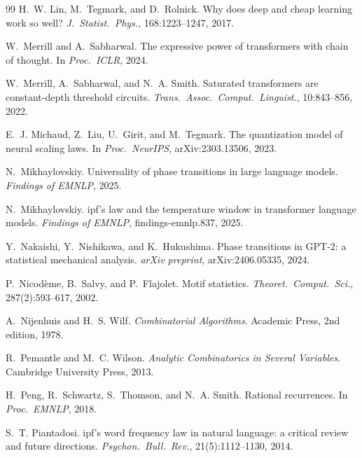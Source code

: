 \begin{thebibliography}{99}
H.~W. Lin, M.~Tegmark, and D.~Rolnick.
\newblock Why does deep and cheap learning work so well?
\newblock \emph{J.\ Statist.\ Phys.}, 168:1223--1247, 2017.

W.~Merrill and A.~Sabharwal.
\newblock The expressive power of transformers with chain of thought.
\newblock In \emph{Proc.\ ICLR}, 2024.

W.~Merrill, A.~Sabharwal, and N.~A. Smith.
\newblock Saturated transformers are constant-depth threshold circuits.
\newblock \emph{Trans.\ Assoc.\ Comput.\ Linguist.}, 10:843--856, 2022.

E.~J. Michaud, Z.~Liu, U.~Girit, and M.~Tegmark.
\newblock The quantization model of neural scaling laws.
\newblock In \emph{Proc.\ NeurIPS}, arXiv:2303.13506, 2023.

N.~Mikhaylovskiy.
\newblock Universality of phase transitions in large language models.
\newblock \emph{Findings of EMNLP}, 2025.

N.~Mikhaylovskiy.
ipf's law and the temperature window in transformer language models.
\newblock \emph{Findings of EMNLP}, findings-emnlp.837, 2025.

Y.~Nakaishi, Y.~Nishikawa, and K.~Hukushima.
\newblock Phase transitions in {GPT-2}: a statistical mechanical analysis.
\newblock \emph{arXiv preprint}, arXiv:2406.05335, 2024.

P.~Nicod\`eme, B.~Salvy, and P.~Flajolet.
\newblock Motif statistics.
\newblock \emph{Theoret.\ Comput.\ Sci.}, 287(2):593--617, 2002.

A.~Nijenhuis and H.~S. Wilf.
\newblock \emph{Combinatorial Algorithms}.
\newblock Academic Press, 2nd edition, 1978.

R.~Pemantle and M.~C. Wilson.
\newblock \emph{Analytic Combinatorics in Several Variables}.
\newblock Cambridge University Press, 2013.

H.~Peng, R.~Schwartz, S.~Thomson, and N.~A. Smith.
\newblock Rational recurrences.
\newblock In \emph{Proc.\ EMNLP}, 2018.

S.~T. Piantadosi.
ipf's word frequency law in natural language: a critical review and future directions.
\newblock \emph{Psychon.\ Bull.\ Rev.}, 21(5):1112--1130, 2014.


\end{thebibliography}
